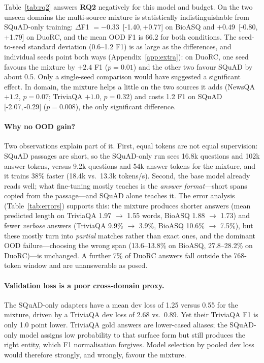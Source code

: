 \documentclass{article}
\newcommand{\RQ}[1]{\textbf{RQ#1}}
\newcommand{\ci}[2]{\,[#1,\,#2]}
\begin{document}
Table~\ref{tab:rq2} answers \RQ{2} negatively for this model and budget. On the two unseen domains the
multi-source mixture is statistically indistinguishable from SQuAD-only training: $\Delta$F1 $=-0.33$
\ci{-1.40}{+0.77} on BioASQ and $+0.49$ \ci{-0.80}{+1.79} on DuoRC, and the mean OOD F1 is 66.2 for both
conditions. The seed-to-seed standard deviation (0.6--1.2 F1) is as large as the differences, and
individual seeds point both ways (Appendix~\ref{app:extra}): on DuoRC, one seed favours the mixture by
$+2.4$ F1 ($p{=}0.01$) and the other two favour SQuAD by about 0.5. Only a single-seed comparison would
have suggested a significant effect. In domain, the mixture helps a little on the two sources it adds
(NewsQA $+1.2$, $p{=}0.07$; TriviaQA $+1.0$, $p{=}0.32$) and costs 1.2 F1 on SQuAD
\ci{-2.07}{-0.29} ($p{=}0.008$), the only significant difference.

\paragraph{Why no OOD gain?} Two observations explain part of it. First, equal tokens are not equal
supervision: SQuAD passages are short, so the SQuAD-only run sees 16.8k questions and 102k answer tokens,
versus 9.2k questions and 54k answer tokens for the mixture, and it trains 38\% faster (18.4k vs.\ 13.3k
tokens/s). Second, the base model already reads well; what fine-tuning mostly teaches is the
\emph{answer format}---short spans copied from the passage---and SQuAD alone teaches it. The error analysis
(Table~\ref{tab:errors}) supports this: the mixture produces shorter answers (mean predicted length on
TriviaQA 1.97 $\rightarrow$ 1.55 words, BioASQ 1.88 $\rightarrow$ 1.73) and fewer \emph{verbose} answers
(TriviaQA 9.9\% $\rightarrow$ 3.9\%, BioASQ 10.6\% $\rightarrow$ 7.5\%), but these mostly turn into
\emph{partial} matches rather than exact ones, and the dominant OOD failure---choosing the wrong span
(13.6--13.8\% on BioASQ, 27.8--28.2\% on DuoRC)---is unchanged. A further 7\% of DuoRC answers fall outside
the 768-token window and are unanswerable as posed.

\paragraph{Validation loss is a poor cross-domain proxy.} The SQuAD-only adapters have a mean dev loss
of 1.25 versus 0.55 for the mixture, driven by a TriviaQA dev loss of 2.68 vs.\ 0.89. Yet their TriviaQA
F1 is only 1.0 point lower. TriviaQA gold answers are lower-cased aliases; the SQuAD-only model assigns
low probability to that surface form but still produces the right entity, which F1 normalisation forgives.
Model selection by pooled dev loss would therefore strongly, and wrongly, favour the mixture.
\end{document}
